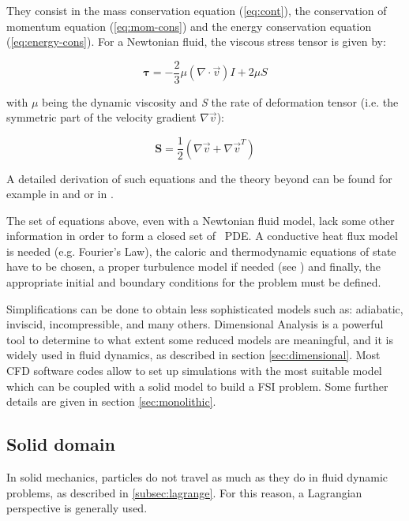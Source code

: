They consist in the mass conservation equation (\ref{eq:cont}), the conservation of momentum equation (\ref{eq:mom-cons}) and the energy conservation equation (\ref{eq:energy-cons}). For a Newtonian fluid, the viscous stress tensor is given by:

\begin{equation}
	\label{eq:tau}
	\bm{\tau} = -\frac{2}{3}\mu \left( \nabla \cdot \vec{v} \right) I +2\mu S
\end{equation}

with $\mu$ being the dynamic viscosity and \textit{S} the rate of deformation tensor (i.e. the symmetric part of the velocity gradient $\nabla \vec{v}$):

\begin{equation}
	\label{eq:def_tens}
	\mathbf{S} = \frac{1}{2} \left( \nabla \vec{v} + \nabla \vec{v}^T \right)
\end{equation}

A detailed derivation of such equations and the theory beyond can be found for example in  \cite{quartapelle2013fluidodinamicaI} and \cite{quartapelle2013fluidodinamicaC} or in \cite{pope2001turbulent}. 

The set of equations above, even with a Newtonian fluid model, lack some other information in order to form a closed set of ~\ac{PDE}. A conductive heat flux model is needed  (e.g. Fourier’s Law), the caloric and thermodynamic equations of state have to be chosen, a proper turbulence model if needed (see \cite{pope2001turbulent}) and finally, the appropriate initial and boundary conditions for the problem \cite{galdi2011introduction} must be defined.

Simplifications can be done to obtain less sophisticated models such as: adiabatic, inviscid, incompressible, and many others. Dimensional Analysis is a powerful tool to determine to what extent some reduced models are meaningful, and it is widely used in fluid dynamics, as described in section \ref{sec:dimensional}. Most CFD software codes allow to set up simulations with the most suitable model which can be coupled with a solid model to build a FSI problem. Some further details are given in section \ref{sec:monolithic}. 


\subsection{Solid domain}
\label{sec:solid}

In solid mechanics, particles do not travel as much as they do in fluid dynamic problems, as described in \ref{subsec:lagrange}. For this reason, a Lagrangian perspective is generally used.  

